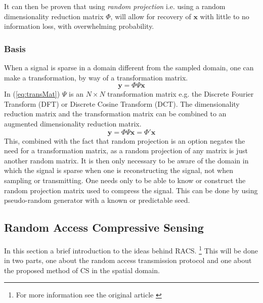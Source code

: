 \documentclass[Main]{subfiles}
\begin{document}
			It can then be proven that using \emph{random projection} i.e. using a random dimensionality reduction matrix $\Phi$, will allow for recovery of $\mathbf{x}$ with little to no information loss, with overwhelming probability.
		

		\subsubsection{Basis} %
		\label{sub:basis}
			
			When a signal is sparse in a domain different from the sampled domain, one can make a transformation, by way of a transformation matrix.
			\begin{equation}
				\mathbf{y} = \Phi \Psi \mathbf{x}
				\label{eq:transMat}	
			\end{equation}
			In (\ref{eq:transMat}) $\Psi$ is an $N \times N$ transformation matrix e.g. the Discrete Fourier Transform (DFT) or Discrete Cosine Transform (DCT).
			The dimensionality reduction matrix and the transformation matrix can be combined to an augmented dimensionality reduction matrix.
			\begin{equation}
				\mathbf{y} = \Phi \Psi \mathbf{x} = \Phi' \mathbf{x}
				\label{eq:augDimReduc}	
			\end{equation}
			This, combined with the fact that random projection is an option negates the need for a transformation matrix, as a random projection of any matrix is just another random matrix.
			It is then only necessary to be aware of the domain in which the signal is sparse when one is reconstructing the signal, not when sampling or transmitting.
			One needs only to be able to know or construct the random projection matrix used to compress the signal.
			This can be done by using pseudo-random generator with a known or predictable seed.


	\subsection{Random Access Compressive Sensing} %
	\label{sub:random_access_compressive_sensing}

		In this section a brief introduction to the ideas behind RACS.
		\footnote{For more information see the original article \cite{Fazel2011}}
		This will be done in two parts, one about the random access transmission protocol and one about the proposed method of CS in the spatial domain.
\end{document}
